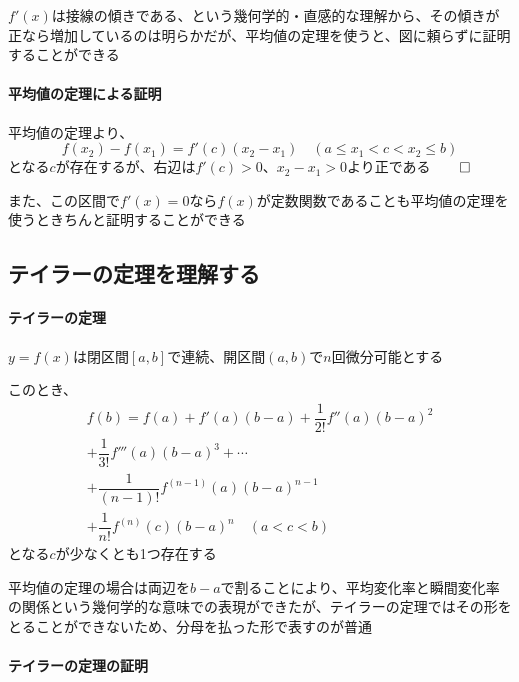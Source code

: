 \documentclass[../book_infinite_continuous_math]{subfiles}
\begin{document}
\br

$f'(x)$は接線の傾きである、という幾何学的・直感的な理解から、その傾きが正なら増加しているのは明らかだが、平均値の定理を使うと、図に頼らずに証明することができる

\paragraph{平均値の定理による証明}\quad

平均値の定理より、
\begin{equation*}
  f(x_2) - f(x_1) = f'(c)(x_2 - x_1) \quad (a \leq x_1 < c < x_2 \leq b)
\end{equation*}
となる$c$が存在するが、右辺は$f'(c)>0$、$x_2 - x_1 > 0$より正である$\qed$

\sectionline

また、この区間で$f'(x) = 0$なら$f(x)$が定数関数であることも平均値の定理を使うときちんと証明することができる


\sectionline
\subsection{テイラーの定理を理解する}

\br

\begin{screen}
  \paragraph{テイラーの定理}
  $y=f(x)$は閉区間$[a, b]$で連続、開区間$(a, b)$で$n$回微分可能とする

  このとき、
  \begin{multline}
    f(b) = f(a) + f'(a)(b-a) + \dfrac{1}{2!}f''(a)(b-a)^2 \\+ \dfrac{1}{3!}f'''(a)(b-a)^3 + \cdots \\+ \dfrac{1}{(n-1)!}f^{(n-1)}(a)(b-a)^{n-1} \\+ \dfrac{1}{n!}f^{(n)}(c)(b-a)^n \quad (a< c < b)
  \end{multline}
  となる$c$が少なくとも1つ存在する
\end{screen}

\br

平均値の定理の場合は両辺を$b-a$で割ることにより、平均変化率と瞬間変化率の関係という幾何学的な意味での表現ができたが、テイラーの定理ではその形をとることができないため、分母を払った形で表すのが普通

\br

\paragraph{テイラーの定理の証明}\quad
\end{document}
